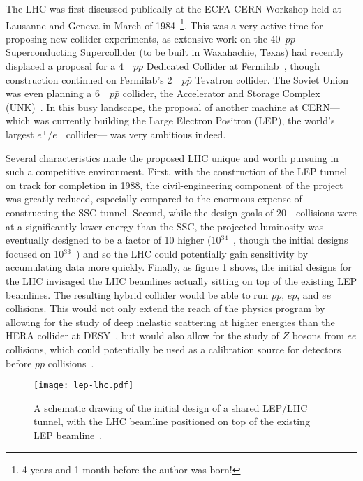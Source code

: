 The LHC was first discussed publically at the ECFA-CERN Workshop held at Lausanne and Geneva in March of 1984~\cite{ECFA1984}\footnote{4 years and 1 month before the author was born!}. This was a very active time for proposing new collider experiments, as extensive work on the 40~\TeV $pp$ Superconducting Supercollider (to be built in Waxahachie, Texas) had recently displaced a proposal for a 4~\TeV~$p\bar{p}$ Dedicated Collider at Fermilab~\cite{ECFA1984,DC}, though construction continued on Fermilab's 2~\TeV~$p\bar{p}$ Tevatron collider. The Soviet Union was even planning a 6~\TeV~$p\bar{p}$ collider, the Accelerator and Storage Complex (UNK)~\cite{UNK}. In this busy landscape, the proposal of another machine at CERN--- which was currently building the Large Electron Positron (LEP), the world's largest $e^+/e^-$ collider--- was very ambitious indeed.

Several characteristics made the proposed LHC unique and worth pursuing in such a competitive environment. First, with the construction of the LEP tunnel on track for completion in 1988, the civil-engineering component of the project was greatly reduced, especially compared to the enormous expense of constructing the SSC tunnel. Second, while the design goals of 20~\TeV~collisions were at a significantly lower energy than the SSC, the projected luminosity was eventually designed to be a factor of 10 higher (10$^{34}$~\lumirate, though the initial designs focused on 10$^{33}$~\lumirate) and so the LHC could potentially gain sensitivity by accumulating data more quickly. Finally, as figure \ref{fig:lhc:lep-lhc} shows, the initial designs for the LHC invisaged the LHC beamlines actually sitting on top of the existing LEP beamlines. The resulting hybrid collider would be able to run $pp$, $ep$, and $ee$ collisions. This would not only extend the reach of the physics program by allowing for the study of deep inelastic scattering at higher energies than the HERA collider at DESY~\cite{Zeus,H1Zeus}, but would also allow for the study of $Z$ bosons from $ee$ collisions, which could potentially be used as a calibration source for detectors before $pp$ collisions~\cite{ECFA1984}.


\begin{figure}
\centering
\texttt{[image: lep-lhc.pdf]}
\label{fig:lhc:lep-lhc}
\caption{A schematic drawing of the initial design of a shared LEP/LHC tunnel, with the LHC beamline positioned on top of the existing LEP beamline~\cite{ECFA1984}.}
\end{figure}

